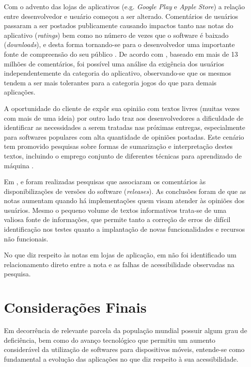 Com o advento das lojas de aplicativos (e.g. \textit{Google Play} e \textit{Apple Store}) a relação entre desenvolvedor e usuário começou a ser alterado. Comentários de usuários passaram a ser postados publicamente causando impactos tanto nas notas do aplicativo (\textit{ratings}) bem como no número de vezes que o software é baixado (\textit{downloads}), e desta forma tornando-se para o desenvolvedor uma importante fonte de compreensão do seu público \cite{Pagano2013userfeedback}. De acordo com \cite{Fu2013whypeoplehate}, baseado em mais de 13 milhões de comentários, foi possível uma análise da exigência dos usuários independentemente da categoria do aplicativo, observando-se que os mesmos tendem a ser mais tolerantes para a categoria jogos do que para demais aplicações.

A oportunidade do cliente de expôr sua opinião com textos livres (muitas vezes com mais de uma ideia\cite{Mcilroy2016analyzing}) por outro lado traz aos desenvolvedores a dificuldade de identificar as necessidades a serem tratadas nas próximas entregas, especialmente para softwares populares com alta quantidade de opiniões postadas. Este cenário tem promovido pesquisas sobre formas de sumarização \cite{Iacob2013retrieving,Iacob2014online,Fu2013whypeoplehate} e interpretação destes textos, incluindo o emprego conjunto de diferentes técnicas para aprendizado de máquina \cite{Panichella2015how}.

Em \cite{Palomba2015userreviews}, \cite{Palompa2018crowdsourcing} e \cite{Li2018MobileAE} foram realizadas pesquisas que associaram os comentários às disponibilizações de versões do software (\textit{releases}). As conclusões foram de que as notas aumentam quando há implementações quem visam atender às opiniões dos usuários. Mesmo o pequeno volume de textos informativos trata-se de uma valiosa fonte de informações, que permite tanto a correção de erros de difícil identificação nos testes quanto a implantação de novas funcionalidades e recursos não funcionais.

No que diz respeito às notas em lojas de aplicação, em \cite{Yan2019currentstatus} não foi identificado um relacionamento direto entre a nota e as falhas de acessibilidade observadas na pesquisa.


\section{Considerações Finais}
Em decorrência de relevante parcela da população mundial possuir algum grau de deficiência, bem como do avanço tecnológico que permitiu um aumento considerável da utilização de softwares para dispositivos móveis, entende-se como fundamental a evolução das aplicações no que diz respeito à sua acessibilidade.

